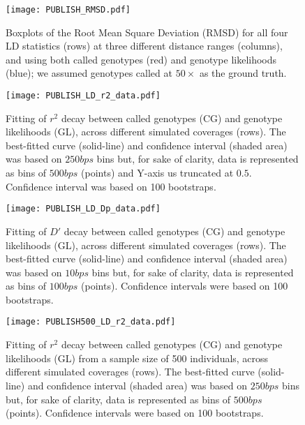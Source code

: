 \documentclass[a4paper]{article}
\begin{document}
\begin{figure}
\centering
\texttt{[image: PUBLISH\_RMSD.pdf]}
\caption{Boxplots of the Root Mean Square Deviation (RMSD) for all four LD statistics (rows) at three different distance ranges (columns), and using both called genotypes (red) and genotype likelihoods (blue); we assumed genotypes called at $50\times$ as the ground truth.}
\label{SFig:RMSD}
\end{figure}


\begin{figure}
\centering
\texttt{[image: PUBLISH\_LD\_r2\_data.pdf]}
\caption{Fitting of $r^2$ decay between called genotypes (CG) and genotype likelihoods (GL), across different simulated coverages (rows). The best-fitted curve (solid-line) and confidence interval (shaded area) was based on $250 bps$ bins but, for sake of clarity, data is represented as bins of $500 bps$ (points) and Y-axis us truncated at $0.5$. Confidence interval was based on 100 bootstraps.}
\label{SFig:r2_data}
\end{figure}

\begin{figure}
\centering
\texttt{[image: PUBLISH\_LD\_Dp\_data.pdf]}
\caption{Fitting of $D'$ decay between called genotypes (CG) and genotype likelihoods (GL), across different simulated coverages (rows). The best-fitted curve (solid-line) and confidence interval (shaded area) was based on $10 bps$ bins but, for sake of clarity, data is represented as bins of $100 bps$ (points). Confidence intervals were based on 100 bootstraps.}
\label{SFig:Dp_data}
\end{figure}

\begin{figure}
\centering
\texttt{[image: PUBLISH500\_LD\_r2\_data.pdf]}
\caption{Fitting of $r^2$ decay between called genotypes (CG) and genotype likelihoods (GL) from a sample size of 500 individuals, across different simulated coverages (rows). The best-fitted curve (solid-line) and confidence interval (shaded area) was based on $250 bps$ bins but, for sake of clarity, data is represented as bins of $500 bps$ (points). Confidence intervals were based on 100 bootstraps.}
\label{SFig:500ind_r2_data}
\end{figure}
\end{document}
